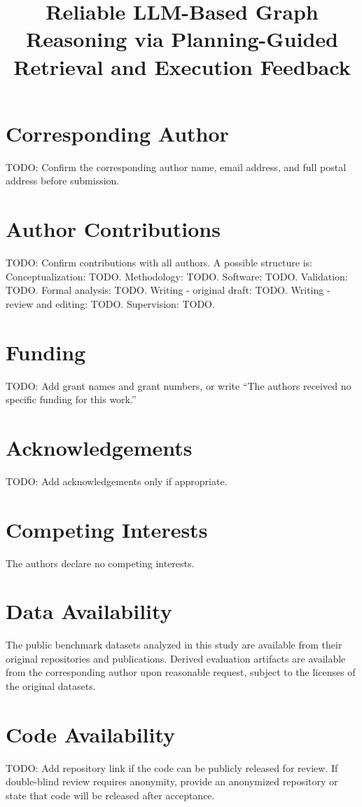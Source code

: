 \documentclass[pdflatex,sn-mathphys-num]{sn-jnl}
\begin{document}
\title[Reliable LLM-Based Graph Reasoning]{Reliable LLM-Based Graph Reasoning via Planning-Guided Retrieval and Execution Feedback}

\author*[1]{ }
\author[1]{ }


\maketitle

\section*{Corresponding Author}
TODO: Confirm the corresponding author name, email address, and full postal address before submission.

\section*{Author Contributions}
TODO: Confirm contributions with all authors. A possible structure is:
Conceptualization: TODO. Methodology: TODO. Software: TODO. Validation: TODO. Formal analysis: TODO. Writing - original draft: TODO. Writing - review and editing: TODO. Supervision: TODO.

\section*{Funding}
TODO: Add grant names and grant numbers, or write ``The authors received no specific funding for this work.''

\section*{Acknowledgements}
TODO: Add acknowledgements only if appropriate.

\section*{Competing Interests}
The authors declare no competing interests.

\section*{Data Availability}
The public benchmark datasets analyzed in this study are available from their original repositories and publications. Derived evaluation artifacts are available from the corresponding author upon reasonable request, subject to the licenses of the original datasets.

\section*{Code Availability}
TODO: Add repository link if the code can be publicly released for review. If double-blind review requires anonymity, provide an anonymized repository or state that code will be released after acceptance.
\end{document}
